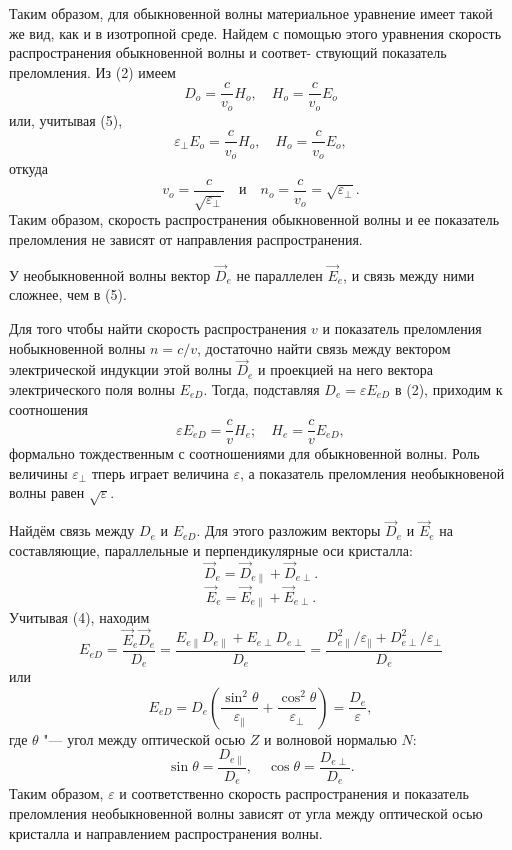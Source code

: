 \documentclass[a4paper, 12pt]{article}%
\begin{document}
Таким образом, для обыкновенной волны материальное уравнение
имеет такой же вид, как и в изотропной среде. Найдем с помощью этого
уравнения скорость распространения обыкновенной волны и соответ-
ствующий показатель преломления. Из (2) имеем
\[
	D_o = \frac{c}{v_o} H_o, \quad H_o = \frac{c}{v_o} E_o
\]
или, учитывая (5),
\[
	\varepsilon_{\perp} E_o = \frac{c}{v_o} H_o, \quad H_o = \frac{c}{v_o} E_o,
\]
откуда
\[
	v_o = \frac{c}{ \sqrt{\varepsilon_{\perp}}} \quad \text{и} \quad n_o = \frac{c}{v_o} = \sqrt{\varepsilon_\perp}.
\]
Таким образом, скорость распространения обыкновенной волны и ее показатель преломления не зависят от направления распространения.

У необыкновенной волны вектор $\vec D_e$ не параллелен $\vec E_e$, и связь между ними сложнее, чем в (5).

Для того чтобы найти скорость распространения $v$ и показатель преломления нобыкновенной волны $n = c / v$, достаточно найти связь между вектором электрической индукции этой волны $\vec D_e$ и проекцией на него вектора электрического поля волны $E_{eD}$. Тогда, подставляя $D_e = \varepsilon E_{eD}$ в (2), приходим к соотношения
\[
	\varepsilon E_{eD} = \frac{c}{v} H_e; \quad H_e = \frac{c}{v} E_{eD},
\]
формально тождественным с соотношениями для обыкновенной волны. Роль величины $\varepsilon_\perp$ тперь играет величина $\varepsilon$, а показатель преломления необыкновеной волны равен $\sqrt{\varepsilon}$.

Найдём связь между $D_e$ и $E_{eD}$. Для этого разложим векторы $\vec D_e$ и $\vec E_e$ на составляющие, параллельные и перпендикулярные оси кристалла:
\[
	\vec D_e = \vec D_{e \parallel} + \vec D_{e \perp}.
\]
\[
	\vec E_e = \vec E_{e \parallel} + \vec E_{e \perp}.
\]
Учитывая (4), находим
\[
	E_{eD} = \frac{\vec E_e \vec D_e}{D_e} = \frac{E_{e \parallel} D_{e \parallel} + E_{e \perp} D_{e \perp}}{D_e} = \frac{D^2_{e \parallel} / \varepsilon_\parallel + D^2_{e \perp} / \varepsilon_\perp}{D_e}
\]
или 
\[
E_{eD} = D_e \left( \frac{\sin^2{\theta}}{\varepsilon_\parallel} + \frac{\cos^2{\theta}}{\varepsilon_\perp} \right) = \frac{D_e}{\varepsilon},
\]
где $\theta$ "--- угол между оптической осью $Z$ и волновой нормалью $N$:
\begin{equation}
	\sin \theta = \frac{D_{e \parallel}}{D_e}, \quad \cos \theta = \frac{D_{e \perp}}{D_e}.
\end{equation}
Таким образом, $\varepsilon$ и соответственно скорость распространения и показатель преломления необыкновенной волны зависят от угла между оптической осью кристалла и   направлением распространения волны.
\end{document}
